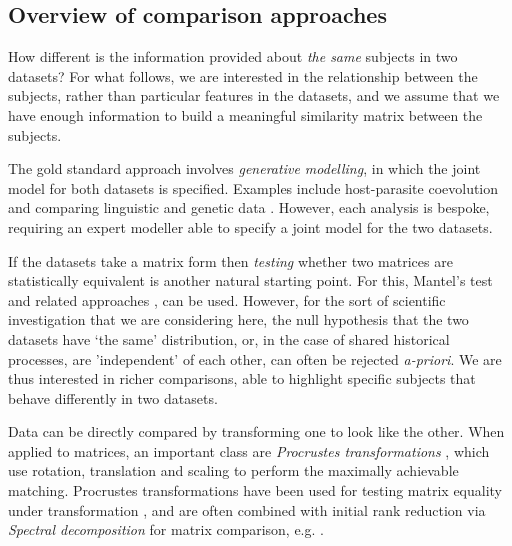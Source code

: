 \documentclass[a4]{article}
\newcommand{\+}[1]{\mathbf{#1}}
\begin{document}
\subsection{Overview of comparison approaches}

How different is the information provided about \emph{the same} subjects in two datasets? For what follows, we are interested in the relationship between the subjects, rather than particular features in the datasets, and we assume that we have enough information to build a meaningful similarity matrix between the subjects.

The gold standard approach involves \emph{generative modelling}, in which the joint model for both datasets is specified. Examples include host-parasite coevolution \cite{BrooksTestingContextExtent1979} and comparing linguistic and genetic data \cite{AmorimBayesianApproachGenome2013}. However, each analysis is bespoke, requiring an expert modeller able to specify a joint model for the two datasets. 

If the datasets take a matrix form then \emph{testing} whether two matrices are statistically equivalent is another natural starting point. For this, Mantel's test \cite{Manteldetectiondiseaseclustering1967} and related approaches \cite{SmouseMultipleRegressionCorrelation1986}, can be used. However, for the sort of scientific investigation that we are considering here, the null hypothesis that the two datasets have `the same' distribution, or, in the case of shared historical processes, are 'independent' of each other, can often be rejected \emph{a-priori}. We are thus interested in richer comparisons, able to highlight specific subjects that behave differently in two datasets. 

Data can be directly compared by transforming one to look like the other. When applied to matrices, an important class are \emph{Procrustes transformations} \cite{HurleyprocrustesprogramProducing1962}, which use rotation, translation and scaling \cite{SchneiderMatrixcomparisonPart2007} to perform the maximally achievable matching.
Procrustes transformations have been used for testing matrix equality under transformation \cite{JacksonPROTESTPROcrusteanRandomization1995}, and are often combined with initial rank reduction via \emph{Spectral decomposition} for matrix comparison, e.g. \cite{Peres-NetoHowwellmultivariate2001}.
\end{document}
